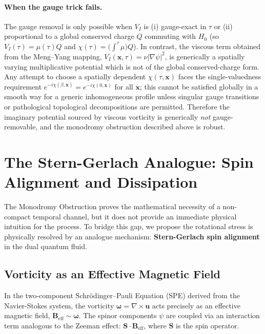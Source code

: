 \documentclass[11pt]{article}
\begin{document}
\paragraph{When the gauge trick fails.}
The gauge removal is only possible when \(V_I\) is (i) gauge-exact in \(\tau\) or (ii) proportional to a global conserved charge \(Q\) commuting with \(H_0\) (so \(V_I(\tau)=\mu(\tau)Q\) and \(\chi(\tau)=\big(\int^\tau \mu\big)Q\)). In contrast, the viscous term obtained from the Meng--Yang mapping, \(V_I(\mathbf x,\tau)=\nu|\nabla\psi|^2\), is generically a spatially varying multiplicative potential which is not of the global conserved-charge form. Any attempt to choose a spatially dependent \(\chi(\tau,\mathbf x)\) faces the single-valuedness requirement \(e^{-i\chi(\beta,\mathbf x)}=e^{-i\chi(0,\mathbf x)}\) for all \(\mathbf x\); this cannot be satisfied globally in a smooth way for a generic inhomogeneous profile unless singular gauge transitions or pathological topological decompositions are permitted. Therefore the imaginary potential sourced by viscous vorticity is generically \emph{not} gauge-removable, and the monodromy obstruction described above is robust.

\section{The Stern-Gerlach\cite{SternGerlach1922} Analogue: Spin Alignment and Dissipation}


The Monodromy Obstruction proves the mathematical necessity of a non-compact temporal channel, but it does not provide an immediate physical intuition for the process. To bridge this gap, we propose the rotational stress is physically resolved by an analogue mechanism: \textbf{Stern-Gerlach\cite{SternGerlach1922} spin alignment} in the dual quantum fluid.

\subsection{Vorticity as an Effective Magnetic Field}

In the two-component Schr\"odinger--Pauli Equation (SPE) derived from the Navier-Stokes system, the vorticity $\mathbf{\omega} = \nabla \times \mathbf{u}$ acts precisely as an effective magnetic field, $\mathbf{B}_{\text{eff}} \sim \mathbf{\omega}$. The spinor components $\psi$ are coupled via an interaction term analogous to the Zeeman effect: $\mathbf{S} \cdot \mathbf{B}_{\text{eff}}$, where $\mathbf{S}$ is the spin operator.
\end{document}
